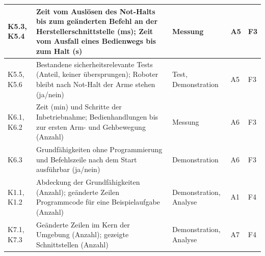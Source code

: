 \begin{table}[htbp]
\begin{tabularx}{\textwidth}{|P{1.9cm}|L|P{2.8cm}|P{2.6cm}|P{1.2cm}|}
        K5.3, K5.4 & Zeit vom Auslösen des Not-Halts bis zum geänderten Befehl an der Herstellerschnittstelle (ms); Zeit vom Ausfall eines Bedienwegs bis zum Halt (s) & Messung & A5 & F3\\\hline
        K5.5, K5.6 & Bestandene sicherheitsrelevante Tests (Anteil, keiner übersprungen); Roboter bleibt nach Not-Halt der Arme stehen (ja/nein) & Test, Demonstration & A5 & F3\\\hline
        K6.1, K6.2 & Zeit (min) und Schritte der Inbetriebnahme; Bedienhandlungen bis zur ersten Arm- und Gehbewegung (Anzahl) & Messung & A6 & F3\\\hline
        K6.3 & Grundfähigkeiten ohne Programmierung und Befehlszeile nach dem Start ausführbar (ja/nein) & Demonstration & A6 & F3\\\hline
        K1.1, K1.2 & Abdeckung der Grundfähigkeiten (Anzahl); geänderte Zeilen Programmcode für eine Beispielaufgabe (Anzahl) & Demonstration, Analyse & A1 & F4\\\hline
        K7.1, K7.3 & Geänderte Zeilen im Kern der Umgebung (Anzahl); gezeigte Schnittstellen (Anzahl) & Demonstration, Analyse & A7 & F4\\\hline
    \end{tabularx}
\end{table}


